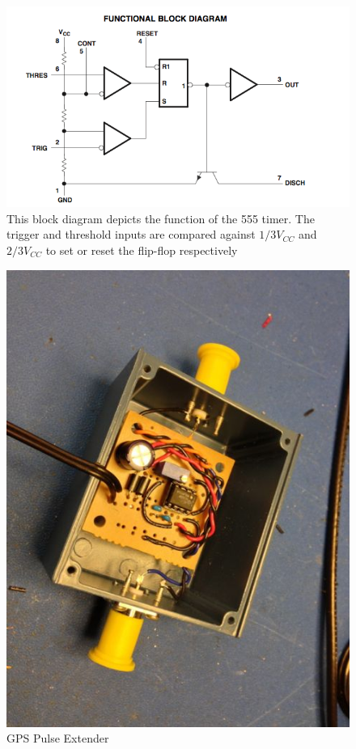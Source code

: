 \begin{figure}[htbp]
	\centering
		\includegraphics[width=15cm]{./figures/timer555.png}
	\caption[555 Timer Diagram]{This block diagram depicts the function of
        the 555 timer. The trigger and threshold inputs are compared against
        $1/3 V_{CC}$ and $2/3 V_{CC}$ to set or reset the flip-flop respectively}
	\label{fig:timer_diag}
\end{figure}


\begin{figure}[htbp]
	\centering
		\includegraphics[width=15cm]{./figures/IMG_1345.jpg}
	\caption{{GPS Pulse Extender}}
	\label{fig:gps_pulse}
\end{figure}

